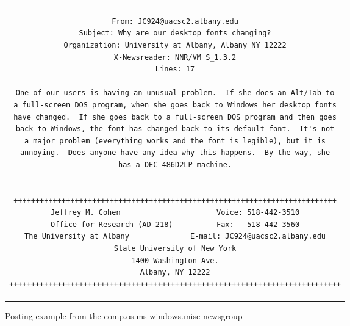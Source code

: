 \documentclass[sigconf]{acmart}
\begin{document}
\begin{figure}
	\begin{center}
		\begin{tabular}{c}
			\begin{lstlisting}[basicstyle=\footnotesize]
From: JC924@uacsc2.albany.edu
Subject: Why are our desktop fonts changing?
Organization: University at Albany, Albany NY 12222
X-Newsreader: NNR/VM S_1.3.2
Lines: 17

One of our users is having an unusual problem.  If she does an Alt/Tab to
a full-screen DOS program, when she goes back to Windows her desktop fonts
have changed.  If she goes back to a full-screen DOS program and then goes
back to Windows, the font has changed back to its default font.  It's not
a major problem (everything works and the font is legible), but it is
annoying.  Does anyone have any idea why this happens.  By the way, she
has a DEC 486D2LP machine.


++++++++++++++++++++++++++++++++++++++++++++++++++++++++++++++++++++++++++
Jeffrey M. Cohen                      Voice: 518-442-3510
Office for Research (AD 218)          Fax:   518-442-3560
The University at Albany              E-mail: JC924@uacsc2.albany.edu
State University of New York
1400 Washington Ave.
Albany, NY 12222
++++++++++++++++++++++++++++++++++++++++++++++++++++++++++++++++++++++++++++
			\end{lstlisting}
		\end{tabular}
	\end{center}
	\caption{Posting example from the comp.os.ms-windows.misc newsgroup}
	\label{fig:post}
\end{figure}
\end{document}
